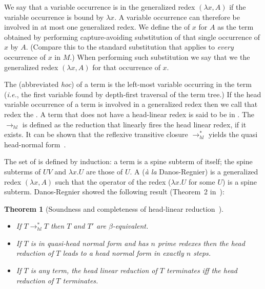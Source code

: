 \documentclass{elsarticle}
\makeatletter
\theoremstyle{plain}
\newtheorem{theorem}{Theorem}[section]
\theoremstyle{definition}
\theoremstyle{remark}
\renewcommand\ie{{\it i.e.\@\xspace}}
\newcommand{\hlred}{\rightarrow_{hl}}
\makeatother
\begin{document}
We say that a variable occurrence is  in the generalized redex $(\lambda x, A)$ if the variable occurrence is bound by $\lambda x$. A variable occurrence can therefore be involved in at most one generalized redex. We define the  of $x$ for $A$ as the term obtained by performing capture-avoiding substitution of that single occurrence of $x$ by $A$. (Compare this to the standard substitution that applies to \emph{every} occurrence of $x$ in $M$.) When performing such substitution we say that we  the generalized redex $(\lambda x, A)$ for that occurrence of $x$.

The  (abbreviated \emph{hoc}) of a term is the left-most variable occurring in the term (\ie, the first variable found by depth-first traversal of the term tree.) If the head variable occurrence of a term is involved in a generalized redex then we call that redex the .
A term that does not have a head-linear redex is said to be in .
The  $\hlred$ is defined as the reduction that linearly fires the head linear redex, if it exists. It can be shown that the reflexive transitive closure $\rightarrow^*_{hl}$ yields the quasi head-normal form~\cite{danos-head,danosherbelinregnier1996}.

The set of  is defined by induction: a term is a spine subterm of itself; the spine subterms of $U V$ and $\lambda x. U$ are those of $U$.
A  ({\it \`a la} Danos-Regnier) is a generalized redex $(\lambda x, A)$ such that the operator of the redex ($\lambda x . U$ for some $U$) is a spine subterm. Danos-Regnier showed the following result (Theorem~2 in~\cite{danos-head}):
\begin{theorem}[Soundness and completeness of head-linear reduction~\cite{danos-head}] \
\label{thm:danosregnier_headlinred}
\begin{itemize}[nosep]
\item If $T \rightarrow^*_{hl} T$  then $T$ and $T'$ are $\beta$-equivalent.
\item If $T$ is in quasi-head normal form and has $n$ prime redexes then the head reduction of $T$ leads to a head normal form in exactly $n$ steps.
\item If $T$ is any term, the head linear reduction of $T$ terminates iff the head reduction of $T$ terminates.
\end{itemize}
\end{theorem}
\end{document}
